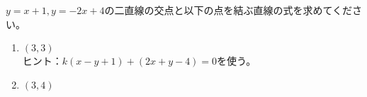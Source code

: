 \documentclass[12pt,a4paper]{jsarticle}
\begin{document}
$y=x+1, y=-2x+4$の二直線の交点と以下の点を結ぶ直線の式を求めてください。
\begin{enumerate}
    \item $ \left( 3,3 \right) $ \\ ヒント：$ k \left( x-y+1 \right) + \left( 2x+y-4 \right) =0 $を使う。
    \item $ \left( 3,4 \right) $
\end{enumerate}
\end{document}
